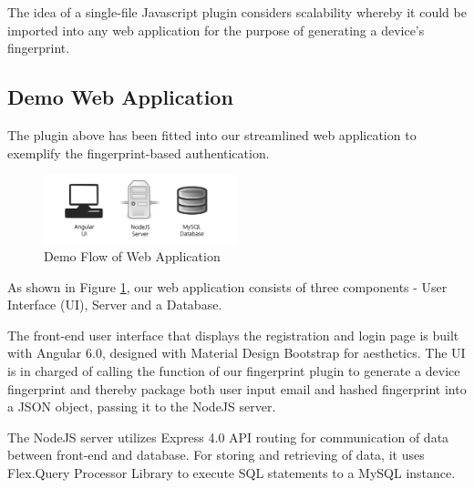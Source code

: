 \documentclass{acm_proc_article-sp}
\begin{document}
The idea of a single-file Javascript plugin considers scalability whereby it could be imported into any web application for the purpose of generating a device’s fingerprint.

\subsection{Demo Web Application}
The plugin above has been fitted into our streamlined web application to exemplify the fingerprint-based authentication.

\begin{figure}[h]
    \centering
    \includegraphics[width=0.5\textwidth]{assets/demo-flow.png}
    \caption{Demo Flow of Web Application}
    \label{fig:demo-flow}
\end{figure}

As shown in Figure \ref{fig:demo-flow}, our web application consists of three components - User Interface (UI), Server and a Database.

The front-end user interface that displays the registration and login page is built with Angular 6.0, designed with Material Design Bootstrap for aesthetics. The UI is in charged of calling the function of our fingerprint plugin to generate a device fingerprint and thereby package both user input email and hashed fingerprint into a JSON object, passing it to the NodeJS server.

The NodeJS server utilizes Express 4.0 API routing for communication of data between front-end and database. For storing and retrieving of data, it uses Flex.Query Processor Library to execute SQL statements to a MySQL instance.
\end{document}
